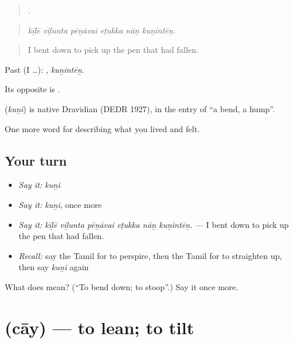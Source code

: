 \begin{quote}
     .
\end{quote}

\begin{quote}
\emph{kīḻē viḻunta pēṉāvai eṭukka nāṉ kuṉintēṉ.}
\end{quote}

\begin{quote}
I bent down to pick up the pen that had fallen.
\end{quote}

Past (I …): , \emph{kuṉintēṉ}.

Its opposite is .

\begin{cousinweb}
\textbf{} (\emph{kuṉi}) is native Dravidian (DEDR 1927), in the entry of  \textquotedblleft{}a bend, a hump\textquotedblright{}.
\end{cousinweb}

\begin{grammarlens}[title={What you've built}]
One more word for describing what you lived and felt.
\end{grammarlens}

\subsection*{Your turn}
\begin{itemize}
\raggedright
  \item \emph{Say it:} \emph{kuṉi}
  \item \emph{Say it:} \emph{kuṉi}, once more
  \item \emph{Say it:} \emph{kīḻē viḻunta pēṉāvai eṭukka nāṉ kuṉintēṉ.} — I bent down to pick up the pen that had fallen.
  \item \emph{Recall:} say the Tamil for to perspire, then the Tamil for to straighten up, then say \emph{kuṉi} again
\end{itemize}

\begin{tcolorbox}[breakable,colback=teal!4,colframe=teal!35!black,title={Before you move on}]
What does  mean? (\textquotedblleft{}To bend down; to stoop\textquotedblright{}.) Say it once more.
\end{tcolorbox}
\section[\texorpdfstring{\ta{சாய்} (cāy)}{சாய் (cāy)}]{ (cāy) — to lean; to tilt}

